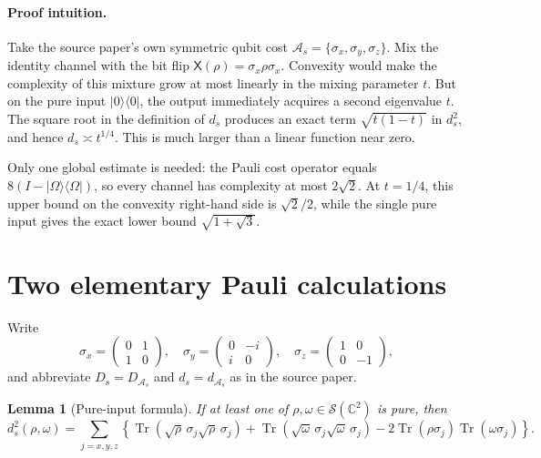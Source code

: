 \documentclass[11pt]{article}
\newtheorem{lemma}{Lemma}
\theoremstyle{remark}
\newcommand{\C}{\mathbb C}
\newcommand{\cS}{\mathcal S}
\newcommand{\tr}{\operatorname{Tr}}
\begin{document}
\paragraph{Proof intuition.}
Take the source paper's own symmetric qubit cost
$\mathcal A_s=\{\sigma_x,\sigma_y,\sigma_z\}$.  Mix the identity channel with
the bit flip $\mathsf X(\rho)=\sigma_x\rho\sigma_x$.  Convexity would make the
complexity of this mixture grow at most linearly in the mixing parameter
$t$.  But on the pure input $|0\rangle\langle0|$, the output immediately
acquires a second eigenvalue $t$.  The square root in the definition of
$d_s$ produces an exact term $\sqrt{t(1-t)}$ in $d_s^2$, and hence
$d_s\asymp t^{1/4}$.  This is much larger than a linear function near zero.

Only one global estimate is needed: the Pauli cost operator equals
$8(I-|\Omega\rangle\langle\Omega|)$, so every channel has complexity at most
$2\sqrt2$.  At $t=1/4$, this upper bound on the convexity right-hand side is
$\sqrt2/2$, while the single pure input gives the exact lower bound
$\sqrt{1+\sqrt3}$.

\section{Two elementary Pauli calculations}

Write
\[
 \sigma_x=\begin{pmatrix}0&1\\1&0\end{pmatrix},\quad
 \sigma_y=\begin{pmatrix}0&-i\\i&0\end{pmatrix},\quad
 \sigma_z=\begin{pmatrix}1&0\\0&-1\end{pmatrix},
\]
and abbreviate $D_s=D_{\mathcal A_s}$ and $d_s=d_{\mathcal A_s}$ as in the
source paper.

\begin{lemma}[Pure-input formula]\label{lem:pure}
If at least one of $\rho,\omega\in\cS(\C^2)$ is pure, then
\begin{equation}\label{eq:pure}
 d_s^2(\rho,\omega)=\sum_{j=x,y,z}
 \left\{
 \tr(\sqrt\rho\,\sigma_j\sqrt\rho\,\sigma_j)
 +\tr(\sqrt\omega\,\sigma_j\sqrt\omega\,\sigma_j)
 -2\tr(\rho\sigma_j)\tr(\omega\sigma_j)
 \right\}.
\end{equation}
\end{lemma}
\end{document}
